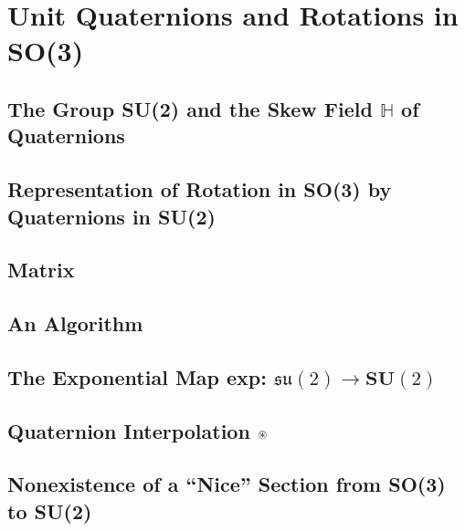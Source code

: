 \documentclass[a4paper]{article}
\begin{document}
\newpage
\section{Unit Quaternions and Rotations in SO(3)}
\subsection{ The Group \textbf{SU}(2) and the Skew Field $\mathbb{H}$ of Quaternions} %

\subsection{ Representation of Rotation in \textbf{SO}(3) by Quaternions in \textbf{SU}(2)} %

\subsection{ Matrix} %

\subsection{ An Algorithm} %

\subsection{ The Exponential Map exp: $\mathfrak{su}(2) \rightarrow \textbf{SU}(2)$} %

\subsection{ Quaternion Interpolation $\oast$} %

\subsection{ Nonexistence of a ``Nice'' Section from  \textbf{SO}(3) to  \textbf{SU}(2)} %
\end{document}
